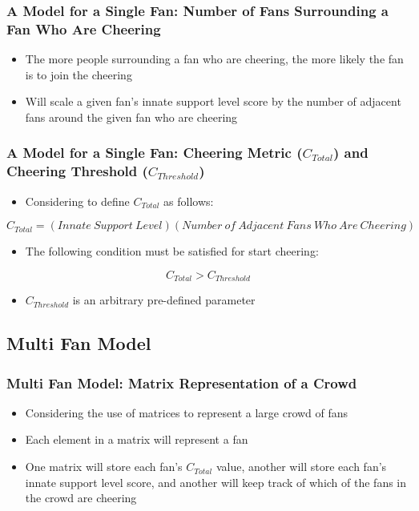 \documentclass[compress,handout,10pt]{beamer}
\let\olditem\item
\renewcommand{\item}{\setlength{\itemsep}{0.5\baselineskip}\olditem}
\begin{document}
\begin {frame}
	\frametitle {A Model for a Single Fan: Number of Fans Surrounding a Fan Who Are Cheering}
		\begin{itemize}
			\item The more people surrounding a fan who are cheering, the more likely the fan is to join the cheering
			\item Will scale a given fan's innate support level score by the number of adjacent fans around the given fan who are cheering
		\end {itemize}
\end {frame}

\begin {frame}
	\frametitle {A Model for a Single Fan: Cheering Metric ($C_{Total}$) and Cheering Threshold ($C_{Threshold}$)}
	\begin{itemize}
		\item Considering to define $C_{Total}$ as follows: \newline
	\end {itemize}
	$$C_{Total} = (Innate\ Support\ Level)(Number\ of\ Adjacent\ Fans\ Who\ Are\ Cheering)$$
	\begin{itemize}
		\item The following condition must be satisfied for start cheering:\newline
	\end {itemize}	
	$$C_{Total}>C_{Threshold}$$
	\begin{itemize}
		\item $C_{Threshold}$ is an arbitrary pre-defined parameter
	\end {itemize}
\end {frame}


\subsection{Multi Fan Model}

\begin{frame}
\frametitle {Multi Fan Model: Matrix Representation of a Crowd}
	\begin {itemize}
		\item Considering the use of matrices to represent a large crowd of fans
		\item Each element in a matrix will represent a fan
		\item One matrix will store each fan's $C_{Total}$ value, another will store each fan's innate support level score, and another will keep track of which of the fans in the crowd are cheering 
	\end{itemize}		
\end{frame}
\end{document}
